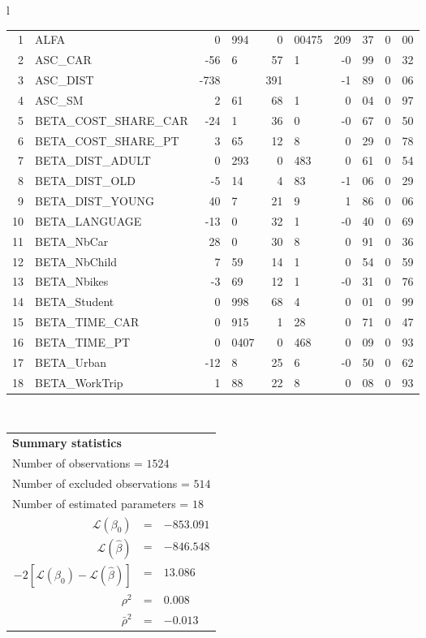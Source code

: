 \begin{tabular}{l}
\begin{tabular}{rlr@{.}lr@{.}lr@{.}lr@{.}l}
1 & ALFA & 0&994 & 0&00475 & 209&37 & 0&00\\
2 & ASC_CAR & -56&6 & 57&1 & -0&99 & 0&32\\
3 & ASC_DIST & -738& & 391& & -1&89 & 0&06\\
4 & ASC_SM & 2&61 & 68&1 & 0&04 & 0&97\\
5 & BETA_COST_SHARE_CAR & -24&1 & 36&0 & -0&67 & 0&50\\
6 & BETA_COST_SHARE_PT & 3&65 & 12&8 & 0&29 & 0&78\\
7 & BETA_DIST_ADULT & 0&293 & 0&483 & 0&61 & 0&54\\
8 & BETA_DIST_OLD & -5&14 & 4&83 & -1&06 & 0&29\\
9 & BETA_DIST_YOUNG & 40&7 & 21&9 & 1&86 & 0&06\\
10 & BETA_LANGUAGE & -13&0 & 32&1 & -0&40 & 0&69\\
11 & BETA_NbCar & 28&0 & 30&8 & 0&91 & 0&36\\
12 & BETA_NbChild & 7&59 & 14&1 & 0&54 & 0&59\\
13 & BETA_Nbikes & -3&69 & 12&1 & -0&31 & 0&76\\
14 & BETA_Student & 0&998 & 68&4 & 0&01 & 0&99\\
15 & BETA_TIME_CAR & 0&915 & 1&28 & 0&71 & 0&47\\
16 & BETA_TIME_PT & 0&0407 & 0&468 & 0&09 & 0&93\\
17 & BETA_Urban & -12&8 & 25&6 & -0&50 & 0&62\\
18 & BETA_WorkTrip & 1&88 & 22&8 & 0&08 & 0&93\\
\hline
\end{tabular}
\\
\begin{tabular}{rcl}
\multicolumn{3}{l}{\bf Summary statistics}\\
\multicolumn{3}{l}{ Number of observations = $1524$} \\
\multicolumn{3}{l}{ Number of excluded observations = $514$} \\
\multicolumn{3}{l}{ Number of estimated  parameters = $18$} \\
 $\mathcal{L}(\beta_0)$ &=&  $-853.091$ \\
 $\mathcal{L}(\hat{\beta})$ &=& $-846.548 $  \\
 $-2[\mathcal{L}(\beta_0) -\mathcal{L}(\hat{\beta})]$ &=& $13.086$ \\
    $\rho^2$ &=&   $0.008$ \\
    $\bar{\rho}^2$ &=&    $-0.013$ \\
\end{tabular}
  \end{tabular}

